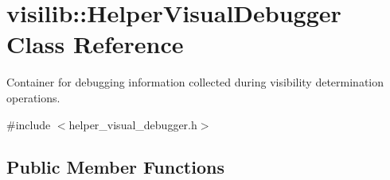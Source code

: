 \hypertarget{classvisilib_1_1_helper_visual_debugger}{}\section{visilib\+::Helper\+Visual\+Debugger Class Reference}
\label{classvisilib_1_1_helper_visual_debugger}


Container for debugging information collected during visibility determination operations.  




{\ttfamily \#include $<$helper\+\_\+visual\+\_\+debugger.\+h$>$}

\subsection*{Public Member Functions}
